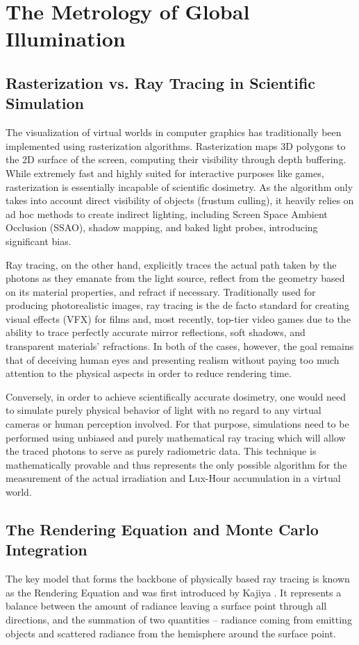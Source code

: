 \section{The Metrology of Global Illumination}

\subsection{Rasterization vs. Ray Tracing in Scientific Simulation}
The visualization of virtual worlds in computer graphics has traditionally been implemented using rasterization algorithms. Rasterization maps 3D polygons to the 2D surface of the screen, computing their visibility through depth buffering. While extremely fast and highly suited for interactive purposes like games, rasterization is essentially incapable of scientific dosimetry. As the algorithm only takes into account direct visibility of objects (frustum culling), it heavily relies on ad hoc methods to create indirect lighting, including Screen Space Ambient Occlusion (SSAO), shadow mapping, and baked light probes, introducing significant bias.

Ray tracing, on the other hand, explicitly traces the actual path taken by the photons as they emanate from the light source, reflect from the geometry based on its material properties, and refract if necessary. Traditionally used for producing photorealistic images, ray tracing is the de facto standard for creating visual effects (VFX) for films and, most recently, top-tier video games due to the ability to trace perfectly accurate mirror reflections, soft shadows, and transparent materials' refractions. In both of the cases, however, the goal remains that of deceiving human eyes and presenting realism without paying too much attention to the physical aspects in order to reduce rendering time.

Conversely, in order to achieve scientifically accurate dosimetry, one would need to simulate purely physical behavior of light with no regard to any virtual cameras or human perception involved. For that purpose, simulations need to be performed using unbiased and purely mathematical ray tracing which will allow the traced photons to serve as purely radiometric data. This technique is mathematically provable and thus represents the only possible algorithm for the measurement of the actual irradiation and Lux-Hour accumulation in a virtual world.

\subsection{The Rendering Equation and Monte Carlo Integration}
The key model that forms the backbone of physically based ray tracing is known as the Rendering Equation and was first introduced by Kajiya \cite{kajiya1986rendering}. It represents a balance between the amount of radiance leaving a surface point through all directions, and the summation of two quantities – radiance coming from emitting objects and scattered radiance from the hemisphere around the surface point.

